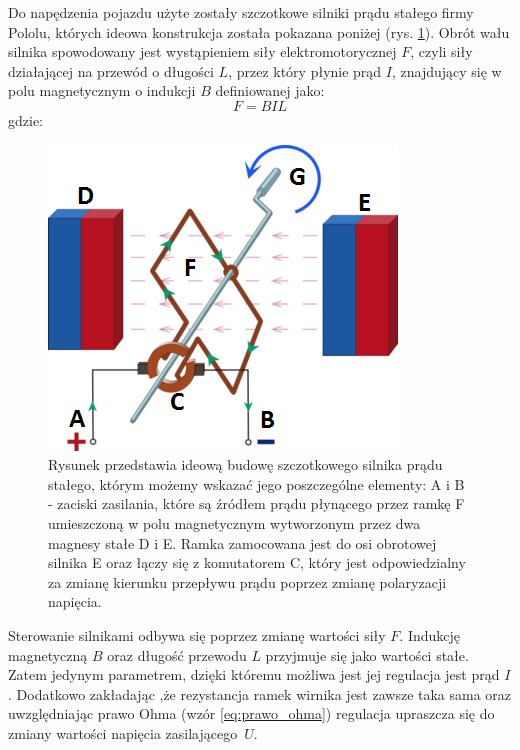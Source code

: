 Do napędzenia pojazdu użyte zostały szczotkowe silniki prądu stałego firmy Pololu, których ideowa konstrukcja została pokazana poniżej (rys. \ref{silnik_p}). Obrót wału silnika spowodowany jest wystąpieniem siły elektromotorycznej $F$, czyli siły działającej na przewód o długości $L$, przez który płynie prąd $I$, znajdujący się w polu magnetycznym o indukcji $B$ definiowanej jako:
\begin{equation}
	F =  BIL
   \label{eq:sila_elektromotoryczna}
 \end{equation}
 gdzie:  
 \begin{equationDescriptor}
 \end{equationDescriptor}
  \begin{figure}[H]
    \begin{center}
      \includegraphics[scale=0.7]{imgs/silnik_p_stalego.png}
 	\caption[Schemat ideowy silnika prądu stałego.]{\small{Rysunek przedstawia ideową budowę szczotkowego silnika prądu stałego, którym możemy wskazać jego poszczególne elementy: A i B - zaciski zasilania, które są źródłem prądu płynącego przez ramkę F umieszczoną w polu magnetycznym wytworzonym przez dwa magnesy stałe D i E. Ramka zamocowana jest do osi obrotowej silnika E oraz łączy się z komutatorem C, który jest odpowiedzialny za zmianę kierunku przepływu prądu poprzez zmianę polaryzacji napięcia.}\footnotemark}
	\label{silnik_p}
    \end{center}
  \end{figure}  
\noindent
Sterowanie silnikami odbywa się poprzez zmianę wartości siły $F$. Indukcję magnetyczną $B$ oraz długość przewodu $L$ przyjmuje się jako wartości stałe. Zatem jedynym parametrem, dzięki któremu możliwa jest jej regulacja jest prąd $I$. Dodatkowo zakładając ,że rezystancja ramek wirnika jest zawsze taka sama oraz uwzględniając prawo Ohma (wzór \ref{eq:prawo_ohma}) regulacja upraszcza się do zmiany wartości napięcia zasilającego~$U$. 
